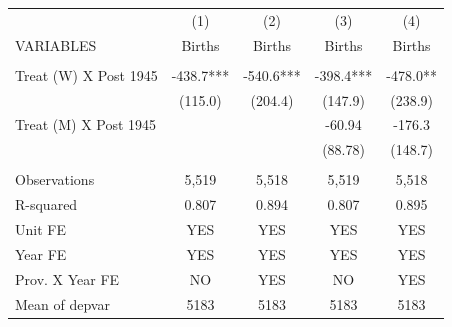 \begin{tabular}{lcccc} \hline
 & (1) & (2) & (3) & (4) \\
VARIABLES & Births & Births & Births & Births \\ \hline
 &  &  &  &  \\
Treat (W) X Post 1945 & -438.7*** & -540.6*** & -398.4*** & -478.0** \\
 & (115.0) & (204.4) & (147.9) & (238.9) \\
Treat (M) X Post 1945 &  &  & -60.94 & -176.3 \\
 &  &  & (88.78) & (148.7) \\
 &  &  &  &  \\
Observations & 5,519 & 5,518 & 5,519 & 5,518 \\
R-squared & 0.807 & 0.894 & 0.807 & 0.895 \\
Unit FE & YES & YES & YES & YES \\
Year FE & YES & YES & YES & YES \\
Prov. X Year FE & NO & YES & NO & YES \\
 Mean of depvar & 5183 & 5183 & 5183 & 5183 \\ \hline
\end{tabular}
